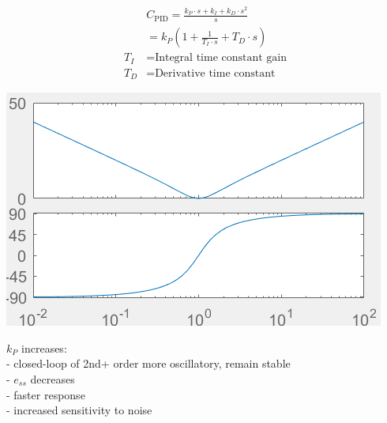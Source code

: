         \begin{minipage}{0.49\linewidth}
            \begin{scriptsize}
                \begin{align*}
                    &C_{\text{PID}}%
                    = \frac{k_P \cdot s + k_I + k_D \cdot s^2}{s}\\
                    &= k_P(1 + \frac{1}{T_I \cdot s} + T_D \cdot s)\\
                    T_I &= \text{Integral time constant gain}\\
                    T_D &= \text{Derivative time constant}
                \end{align*}
            \end{scriptsize}
        \end{minipage}
        \begin{minipage}{0.49\linewidth}
            \includegraphics[width = \linewidth]{src/images/PID-controller.png}
        \end{minipage}

        $k_P$ increases:\\
        - closed-loop of 2nd+ order more oscillatory, remain stable\\
        - $e_{ss}$ decreases\\
        - faster response\\
        - increased sensitivity to noise

